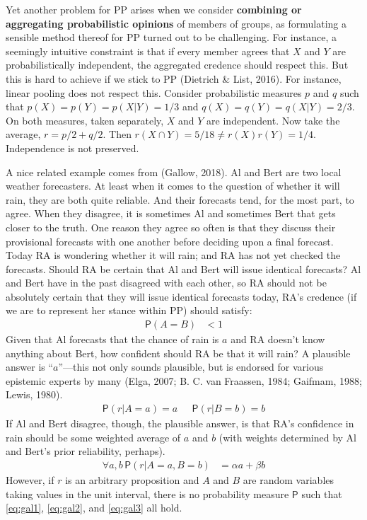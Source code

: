 \documentclass[
  10pt,
  dvipsnames,enabledeprecatedfontcommands]{scrartcl}
\newcommand{\pr}[1]{\mathsf{P}(#1)}
\begin{document}
Yet another problem for PP arises when we consider
\textbf{combining or aggregating probabilistic opinions} of members of
groups, as formulating a sensible method thereof for PP turned out to be
challenging. For instance, a seemingly intuitive constraint is that if
every member agrees that \(X\) and \(Y\) are probabilistically
independent, the aggregated credence should respect this. But this is
hard to achieve if we stick to PP (Dietrich \& List, 2016). For
instance, linear pooling does not respect this. Consider probabilistic
measures \(p\) and \(q\) such that \(p(X) = p(Y) = p(X\vert Y) = 1/3\)
and \(q(X) = q(Y) = q(X\vert Y) = 2/3\). On both measures, taken
separately, \(X\) and \(Y\) are independent. Now take the average,
\(r=p/2+q/2\). Then \(r(X\cap Y) = 5/18 \neq r(X)r(Y)=1/4\).
Independence is not preserved.

A nice related example comes from (Gallow, 2018). Al and Bert are two
local weather forecasters. At least when it comes to the question of
whether it will rain, they are both quite reliable. And their forecasts
tend, for the most part, to agree. When they disagree, it is sometimes
Al and sometimes Bert that gets closer to the truth. One reason they
agree so often is that they discuss their provisional forecasts with one
another before deciding upon a final forecast. Today RA is wondering
whether it will rain; and RA has not yet checked the forecasts. Should
RA be certain that Al and Bert will issue identical forecasts? Al and
Bert have in the past disagreed with each other, so RA should not be
absolutely certain that they will issue identical forecasts today, RA's
credence (if we are to represent her stance within PP) should satisfy:
\begin{align} \label{eq:gal1}
\pr{A=B} & <1
\end{align} \noindent Given that Al forecasts that the chance of rain is
\(a\) and RA doesn't know anything about Bert, how confident should RA
be that it will rain? A plausible answer is ``\(a\)''---this not only
sounds plausible, but is endorsed for various epistemic experts by many
(Elga, 2007; B. C. van Fraassen, 1984; Gaifmam, 1988; Lewis, 1980).
\begin{align} \label{eq:gal2}
\pr{r\vert A=a}  = a  &  \,\,\,\, \pr{r\vert B=b}  = b
\end{align} If Al and Bert disagree, though, the plausible answer, is
that RA's confidence in rain should be some weighted average of \(a\)
and \(b\) (with weights determined by Al and Bert's prior reliability,
perhaps). \begin{align} \label{eq:gal3}
\forall a,b \, \pr{r \vert A =a, B = b} & =  \alpha a + \beta b
\end{align} \noindent However, if \(r\) is an arbitrary proposition and
\(A\) and \(B\) are random variables taking values in the unit interval,
there is no probability measure \(\mathsf{P}\) such that
\eqref{eq:gal1}, \eqref{eq:gal2}, and \eqref{eq:gal3} all hold.
\end{document}
